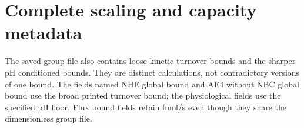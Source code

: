 

\section{Complete scaling and capacity metadata}
The saved group file also contains loose kinetic turnover bounds and the sharper pH conditioned bounds. They are distinct calculations, not contradictory versions of one bound. The fields named NHE global bound and AE4 without NBC global bound use the broad printed turnover bound; the physiological fields use the specified pH floor. Flux bound fields retain fmol/s even though they share the dimensionless group file.

